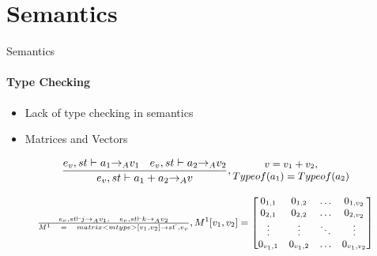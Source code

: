 \section{Semantics}

\begin{frame}{Semantics}
\framesubtitle{Type Checking}

\begin{itemize}
  \item Lack of type checking in semantics
  \item Matrices and Vectors
\end{itemize}

\begin{equation}
\small
\frac { { e }_{ v },st\vdash { a }_{ 1 }{ \rightarrow  }_{ A }{ v }_{ 1 }\quad { e }_{ v },st\vdash { a }_{ 2 }{ \rightarrow  }_{ A }{ v }_{ 2 } }{ { e }_{ v },st\vdash { a }_{ 1 }+{ a }_{ 2 }{ \rightarrow  }_{ A }{ v } } ,\begin{matrix} v={ v }_{ 1 }+{ v }_{ 2 }, \\ Typeof({ a }_{ 1 }) = Typeof({ a }_{ 2 }) \end{matrix}
\end{equation}

\begin{equation}
\resizebox{.9\textwidth}{!}{

\small
    $\frac { { e }_{ v },st\vdash j{ \rightarrow  }_{ A }{ v }_{ 1 },\quad { e }_{ v },st\vdash k{ \rightarrow  }_{ A }{ v }_{ 2 } }{ { M }^{ 1 }\quad =\quad matrix<mtype>[{ v }_{ 1 },{ v }_{ 2 }]\rightarrow { st }^{ ` },{ e }_{ v } }  ,{ M }^{ 1 }[{ v }_{ 1 },{ v }_{ 2 }]= \begin{bmatrix} { { 0 }_{ 1,1 } } & 0_{ 1,2 } & \dots  & { 0 }_{ { 1,{ v }_{ 2 } } } \\ 0_{ 2,1 } & 0_{ 2,2 } & \dots  & 0_{ 2,v_{ 2 } } \\ \vdots  & \vdots  & \ddots  & \vdots  \\ { 0 }_{ { v }_{ 1 },1 } & 0_{ v_{ 1 },2 } & \dots  & { 0 }_{ { v }_{ 1 },{ v }_{ 2 } } \end{bmatrix}$
    }
\end{equation}

\end{frame}

